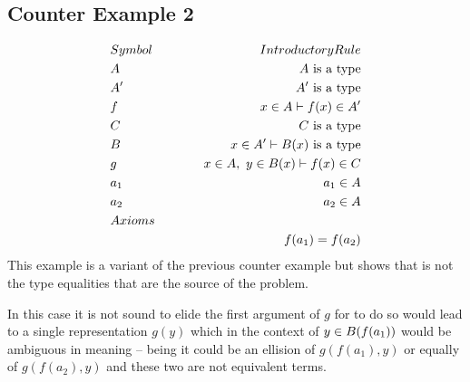\documentclass[10pt,a4paper,fleqn]{article}
\begin{document}
\subsection*{Counter Example 2}
			\begin{eqnarray}
		&Symbol&\hspace{1cm}Introductory Rule \nonumber \\
		&A \hspace{0.25cm}
		&\hspace{1cm}\isT{A}\label{ex3-A} \\
		&A' \hspace{0.25cm}
		&\hspace{1cm}\isT{A'}\label{ex3-A'} \\
		&f \hspace{0.25cm}
		&\hspace{1cm}\ofT{x}{A}\tstyle\ofT{f(x)}{A'}\label{ex3-f} \\
		&C \hspace{0.25cm}
		&\hspace{1cm}\isT{C}\label{ex3-C} \\
		&B \hspace{0.25cm}
		&\hspace{1cm}\ofT{x}{A'}\tstyle\isT{B(x)}\label{ex3-B} \\
		&g \hspace{0.25cm}
		&\hspace{1cm}\ofT{x}{A},\ \ofT{y}{B(x)}\tstyle\ofT{f(x)}{C}\label{ex3-g} \\
		&a_1 \hspace{0.25cm}
		&\hspace{1cm}\ofT{a_1}{A}\label{ex3-a_1} \\
		&a_2 \hspace{0.25cm}
		&\hspace{1cm}\ofT{a_2}{A}\label{ex3-a_2} \\
		&Axioms&\nonumber \\
		&&f(a_1) = f(a_2)\label{ex3-axiom}
		\end{eqnarray} 
			\noindent
\noindent
This example is a variant of the previous counter example but shows that is not the 
type equalities that are the source of the problem.
			
		
		
		
		
		
			\noindent
In this case it is not sound to elide the first argument of $g$ for to do so would lead to
		a single representation $g(y)$ which in the context of $y \in B(f(a_1))$ would be ambiguous 
		in meaning -- being it could be an ellision of $g(f(a_1),y)$ or equally of
		$g(f(a_2),y)$ and these two are not equivalent terms.
\end{document}
